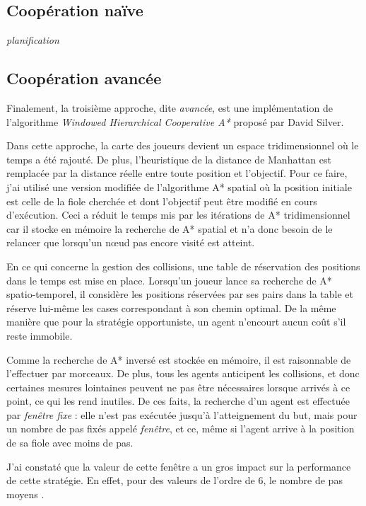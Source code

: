 \documentclass[letterpaper]{article}
\begin{document}
\subsection{Coop\'eration na\"ive}
\textit{planification}

\subsection{Coop\'eration avanc\'ee}
Finalement, la troisi\`eme approche, dite \textit{avanc\'ee}, est une impl\'ementation de l'algorithme \textit{Windowed Hierarchical Cooperative A*} propos\'e par David Silver. %

Dans cette approche, la carte des joueurs devient un espace tridimensionnel o\`u le temps a \'et\'e rajout\'e.
De plus, l'heuristique de la distance de Manhattan est remplac\'ee par la distance r\'eelle entre toute position et l'objectif.
Pour ce faire, j'ai utilis\'e une version modifi\'ee de l'algorithme A* spatial o\`u la position initiale est celle de la fiole cherch\'ee et dont l'objectif peut \^etre modifi\'e en cours d'ex\'ecution.
Ceci a r\'eduit le temps mis par les it\'erations de A* tridimensionnel car il stocke en m\'emoire la recherche de A* spatial et n'a donc besoin de le relancer que lorsqu'un n\oe ud pas encore visit\'e est atteint.

En ce qui concerne la gestion des collisions, une table de r\'eservation des positions  dans le temps est mise en place.
Lorsqu'un joueur lance sa recherche de A* spatio-temporel, il consid\`ere les positions r\'eserv\'ees par ses pairs dans la table et r\'eserve lui-m\^eme les cases correspondant \`a son chemin optimal.
De la m\^eme mani\`ere que pour la strat\'egie opportuniste, un agent n'encourt aucun co\^ut s'il reste immobile.

Comme la recherche de A* invers\'e est stock\'ee en m\'emoire, il est raisonnable de l'effectuer par morceaux.
De plus, tous les agents anticipent les collisions, et donc certaines mesures lointaines peuvent ne pas \^etre n\'ecessaires lorsque arriv\'es \`a ce point, ce qui les rend inutiles.
De ces faits, la recherche d'un agent est effectu\'ee par \textit{fen\^etre fixe} : elle n'est pas ex\'ecut\'ee jusqu'\`a l'atteignement du but, mais pour un nombre de pas fix\'es appel\'e \textit{fen\^etre}, et ce, m\^eme si l'agent arrive \`a la position de sa fiole avec moins de pas.

J'ai constat\'e que la valeur de cette fen\^etre a un gros impact sur la performance de cette strat\'egie.
En effet, pour des valeurs de l'ordre de 6, le nombre de pas moyens .
\end{document}
